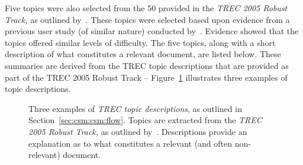 Five topics were also selected from the 50 provided in the \emph{TREC 2005 Robust Track,} as outlined by~\cite{voorhees2006trec_robust}. These topics were selected based upon evidence from a previous user study (of similar nature) conducted by~\cite{kelly2015serp_size}. Evidence showed that the topics offered similar levels of difficulty. The five topics, along with a short description of what constitutes a relevant document, are listed below. These summaries are derived from the TREC topic descriptions that are provided as part of the TREC 2005 Robust Track -- Figure~\ref{fig:topics} illustrates three examples of topic descriptions.

\begin{figure}[t!]
    \centering
    \caption[Examples of TREC Topics]{Three examples of \emph{TREC topic descriptions}, as outlined in Section~\ref{sec:csm:csm:flow}. Topics are extracted from the \emph{TREC 2005 Robust Track,} as outlined by~\cite{voorhees2006trec_robust}. Descriptions provide an explanation as to what constitutes a relevant (and often non-relevant) document.}
    \label{fig:topics}
\end{figure}


